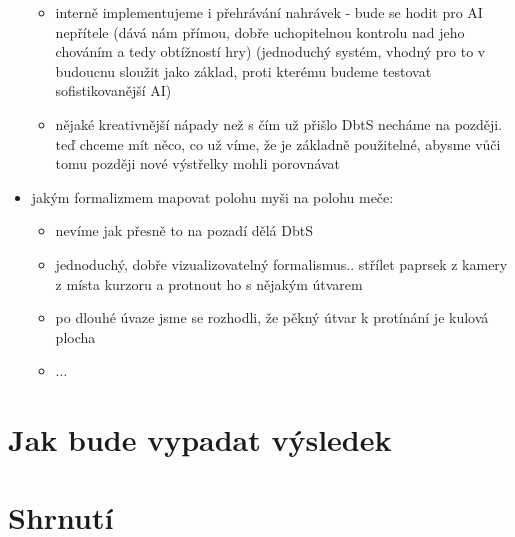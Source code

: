 \begin{itemize}
\begin{itemize}
\begin{itemize}
            \end{itemize}
            \item interně implementujeme i přehrávání nahrávek - bude se hodit pro AI nepřítele (dává nám přímou, dobře uchopitelnou kontrolu nad jeho chováním a tedy obtížností hry) (jednoduchý systém, vhodný pro to v budoucnu sloužit jako základ, proti kterému budeme testovat sofistikovanější AI)
            \item nějaké kreativnější nápady než s čím už přišlo DbtS necháme na později. teď chceme mít něco, co už víme, že je základně použitelné, abysme vůči tomu později nové výstřelky mohli porovnávat
        \end{itemize}
    \item jakým formalizmem mapovat polohu myši na polohu meče:
        \begin{itemize}
            \item nevíme jak přesně to na pozadí dělá DbtS
            \item  jednoduchý, dobře vizualizovatelný formalismus.. střílet paprsek z kamery z místa kurzoru a protnout ho s nějakým útvarem 
            \item  po dlouhé úvaze jsme se rozhodli, že pěkný útvar k protínání je kulová plocha
            \item  ...
        \end{itemize}
\end{itemize}


\section{Jak bude vypadat výsledek}


\section{Shrnutí}
